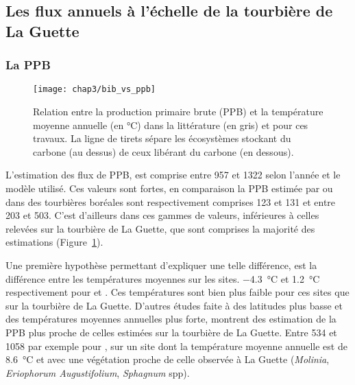 \subsubsection{\fchh}

\subsection{Les flux annuels à l'échelle de la tourbière de La Guette}

\subsubsection{La PPB}

\begin{figure}
\centering
\texttt{[image: chap3/bib\_vs\_ppb]}
\caption{Relation entre la production primaire brute (PPB) et la température moyenne annuelle (en °C) dans la littérature (en gris) et pour ces travaux. La ligne de tirets sépare les écosystèmes stockant du carbone (au dessus) de ceux libérant du carbone (en dessous).}
\label{fig:bib_vs_ppb}
\end{figure}

L'estimation des flux de PPB, est comprise entre 957 et \SI{1322}{\gcma} selon l'année et le modèle utilisé.
Ces valeurs sont fortes, en comparaison la PPB estimée par  \citet{trudeau2014} ou \citet{peichl2014} dans des tourbières boréales sont respectivement comprises  123 et \SI{131}{\gcma} et entre 203 et \SI{503}{\gcma}.
C'est d'ailleurs dans ces gammes de valeurs, inférieures à celles relevées sur la tourbière de La Guette, que sont comprises la majorité des estimations (Figure~\ref{fig:bib_vs_ppb}).

Une première hypothèse permettant d'expliquer une telle différence, est la différence entre les températures moyennes sur les sites.
\SI{-4.3}{\degreeCelsius} et \SI{1.2}{\degreeCelsius} respectivement pour \citet{trudeau2014} et \citet{peichl2014}.
Ces températures sont bien plus faible pour ces sites que sur la tourbière de La Guette.
D'autres études faite à des latitudes plus basse et des températures moyennes annuelles plus forte, montrent des estimation de la PPB plus proche de celles estimées sur la tourbière de La Guette.
Entre 534 et \SI{1058}{\gcma} par exemple pour \citet{beyer2015}, sur un site dont la température moyenne annuelle est de \SI{8.6}{\degreeCelsius} et avec une végétation proche de celle observée à La Guette (\textit{Molinia}, \textit{Eriophorum Augustifolium}, \textit{Sphagnum} spp).

